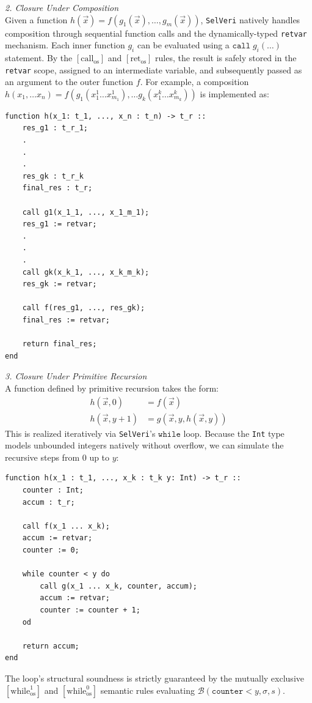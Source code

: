 \documentclass{article}
\begin{document}
\newpage
\textit{2. Closure Under Composition} \\
Given a function $h(\vec{x}) = f(g_1(\vec{x}), \dots, g_m(\vec{x}))$, \texttt{SelVeri} natively handles composition through sequential function calls and the dynamically-typed \texttt{retvar} mechanism. Each inner function $g_i$ can be evaluated using a $\mathtt{call}\; g_i(\dots)$ statement. By the $[\text{call}_{\text{os}}]$ and $[\text{ret}_{\text{os}}]$ rules, the result is safely stored in the \texttt{retvar} scope, assigned to an intermediate variable, and subsequently passed as an argument to the outer function $f$. For example, a composition $h(x_1, \dots x_n) = f(g_1(x^1_1 \dots x_{m_1}^1), \dots g_k(x^k_1 \dots x_{m_k}^k))$ is implemented as:
\begin{verbatim}
function h(x_1: t_1, ..., x_n : t_n) -> t_r ::
    res_g1 : t_r_1;
    .
    .
    .
    res_gk : t_r_k
    final_res : t_r;
    
    call g1(x_1_1, ..., x_1_m_1);
    res_g1 := retvar;
    .
    .
    .
    call gk(x_k_1, ..., x_k_m_k);
    res_gk := retvar;
    
    call f(res_g1, ..., res_gk);
    final_res := retvar;
    
    return final_res;
end
\end{verbatim}


\textit{3. Closure Under Primitive Recursion} \\
A function defined by primitive recursion takes the form:
\begin{align*}
h(\vec{x}, 0) &= f(\vec{x}) \\
h(\vec{x}, y+1) &= g(\vec{x}, y, h(\vec{x}, y))
\end{align*}
This is realized iteratively via \texttt{SelVeri}'s $\mathtt{while}$ loop. Because the \texttt{Int} type models unbounded integers natively without overflow, we can simulate the recursive steps from $0$ up to $y$:
\begin{verbatim}
function h(x_1 : t_1, ..., x_k : t_k y: Int) -> t_r ::
    counter : Int;
    accum : t_r;
    
    call f(x_1 ... x_k);
    accum := retvar;
    counter := 0;
    
    while counter < y do
        call g(x_1 ... x_k, counter, accum);
        accum := retvar;
        counter := counter + 1;
    od
    
    return accum;
end
\end{verbatim}

The loop's structural soundness is strictly guaranteed by the mutually exclusive $[\text{while}^1_{\text{os}}]$ and $[\text{while}^0_{\text{os}}]$ semantic rules evaluating $\mathcal{B}(\mathtt{counter} < y, \sigma, s)$. \\
\end{document}
